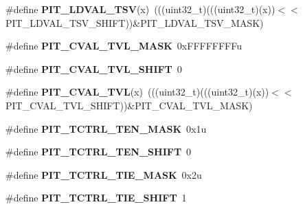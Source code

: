 \begin{DoxyCompactItemize}
\item 
\#define {\bfseries P\+I\+T\+\_\+\+L\+D\+V\+A\+L\+\_\+\+T\+SV}(x)~(((uint32\+\_\+t)(((uint32\+\_\+t)(x))$<$$<$P\+I\+T\+\_\+\+L\+D\+V\+A\+L\+\_\+\+T\+S\+V\+\_\+\+S\+H\+I\+FT))\&P\+I\+T\+\_\+\+L\+D\+V\+A\+L\+\_\+\+T\+S\+V\+\_\+\+M\+A\+SK)\hypertarget{group__PIT__Register__Masks_ga1aa1b498b2c8f1a14d095370a7ddf9a6}{}\label{group__PIT__Register__Masks_ga1aa1b498b2c8f1a14d095370a7ddf9a6}

\item 
\#define {\bfseries P\+I\+T\+\_\+\+C\+V\+A\+L\+\_\+\+T\+V\+L\+\_\+\+M\+A\+SK}~0x\+F\+F\+F\+F\+F\+F\+F\+Fu\hypertarget{group__PIT__Register__Masks_ga2810b877338372cb9b9d944b206c08d3}{}\label{group__PIT__Register__Masks_ga2810b877338372cb9b9d944b206c08d3}

\item 
\#define {\bfseries P\+I\+T\+\_\+\+C\+V\+A\+L\+\_\+\+T\+V\+L\+\_\+\+S\+H\+I\+FT}~0\hypertarget{group__PIT__Register__Masks_ga28753a1a45034ccd34e052faa3e02ff0}{}\label{group__PIT__Register__Masks_ga28753a1a45034ccd34e052faa3e02ff0}

\item 
\#define {\bfseries P\+I\+T\+\_\+\+C\+V\+A\+L\+\_\+\+T\+VL}(x)~(((uint32\+\_\+t)(((uint32\+\_\+t)(x))$<$$<$P\+I\+T\+\_\+\+C\+V\+A\+L\+\_\+\+T\+V\+L\+\_\+\+S\+H\+I\+FT))\&P\+I\+T\+\_\+\+C\+V\+A\+L\+\_\+\+T\+V\+L\+\_\+\+M\+A\+SK)\hypertarget{group__PIT__Register__Masks_ga00291ae8d045c0b0f199d8950c7e453a}{}\label{group__PIT__Register__Masks_ga00291ae8d045c0b0f199d8950c7e453a}

\item 
\#define {\bfseries P\+I\+T\+\_\+\+T\+C\+T\+R\+L\+\_\+\+T\+E\+N\+\_\+\+M\+A\+SK}~0x1u\hypertarget{group__PIT__Register__Masks_ga1099670711f996f5fa84e33bbfe794b2}{}\label{group__PIT__Register__Masks_ga1099670711f996f5fa84e33bbfe794b2}

\item 
\#define {\bfseries P\+I\+T\+\_\+\+T\+C\+T\+R\+L\+\_\+\+T\+E\+N\+\_\+\+S\+H\+I\+FT}~0\hypertarget{group__PIT__Register__Masks_ga0080137ff0378087f08cc12fd10b3e1f}{}\label{group__PIT__Register__Masks_ga0080137ff0378087f08cc12fd10b3e1f}

\item 
\#define {\bfseries P\+I\+T\+\_\+\+T\+C\+T\+R\+L\+\_\+\+T\+I\+E\+\_\+\+M\+A\+SK}~0x2u\hypertarget{group__PIT__Register__Masks_ga99639aabcac1d6042d14e7893d00bf67}{}\label{group__PIT__Register__Masks_ga99639aabcac1d6042d14e7893d00bf67}

\item 
\#define {\bfseries P\+I\+T\+\_\+\+T\+C\+T\+R\+L\+\_\+\+T\+I\+E\+\_\+\+S\+H\+I\+FT}~1\hypertarget{group__PIT__Register__Masks_gae21aee9e81741a924c9f2824fbc5775b}{}\label{group__PIT__Register__Masks_gae21aee9e81741a924c9f2824fbc5775b}


\end{DoxyCompactItemize}
